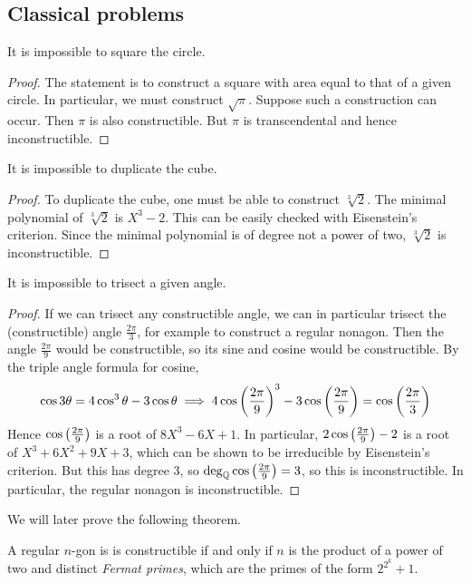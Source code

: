 \subsection{Classical problems}
\begin{theorem}
	It is impossible to square the circle.
\end{theorem}
\begin{proof}
	The statement is to construct a square with area equal to that of a given circle.
	In particular, we must construct \( \sqrt \pi \).
	Suppose such a construction can occur.
	Then \( \pi \) is also constructible.
	But \( \pi \) is transcendental and hence inconstructible.
\end{proof}
\begin{theorem}
	It is impossible to duplicate the cube.
\end{theorem}
\begin{proof}
	To duplicate the cube, one must be able to construct \( \sqrt[3]{2} \).
	The minimal polynomial of \( \sqrt[3]{2} \) is \( X^3 - 2 \).
	This can be easily checked with Eisenstein's criterion.
	Since the minimal polynomial is of degree not a power of two, \( \sqrt[3]{2} \) is inconstructible.
\end{proof}
\begin{theorem}
	It is impossible to trisect a given angle.
\end{theorem}
\begin{proof}
	If we can trisect any constructible angle, we can in particular trisect the (constructible) angle \( \frac{2\pi}{3} \), for example to construct a regular nonagon.
	Then the angle \( \frac{2\pi}{9} \) would be constructible, so its sine and cosine would be constructible.
	By the triple angle formula for cosine,
	\[ \cos 3\theta = 4\cos^3 \theta - 3 \cos\theta \implies 4\cos\qty(\frac{2\pi}{9})^3 - 3\cos\qty(\frac{2\pi}{9}) = \cos\qty(\frac{2\pi}{3}) \]
	Hence \( \cos\qty(\frac{2\pi}{9}) \) is a root of \( 8X^3 - 6X + 1 \).
	In particular, \( 2\cos\qty(\frac{2\pi}{9}) - 2 \) is a root of \( X^3 + 6X^2 + 9X + 3 \), which can be shown to be irreducible by Eisenstein's criterion.
	But this has degree 3, so \( \deg_{\mathbb Q} \cos \qty(\frac{2\pi}{9}) = 3 \), so this is inconstructible.
	In particular, the regular nonagon is inconstructible.
\end{proof}
We will later prove the following theorem.
\begin{theorem}[Gauss]
	A regular \( n \)-gon is is constructible if and only if \( n \) is the product of a power of two and distinct \emph{Fermat primes}, which are the primes of the form \( 2^{2^k} + 1 \).
\end{theorem}
